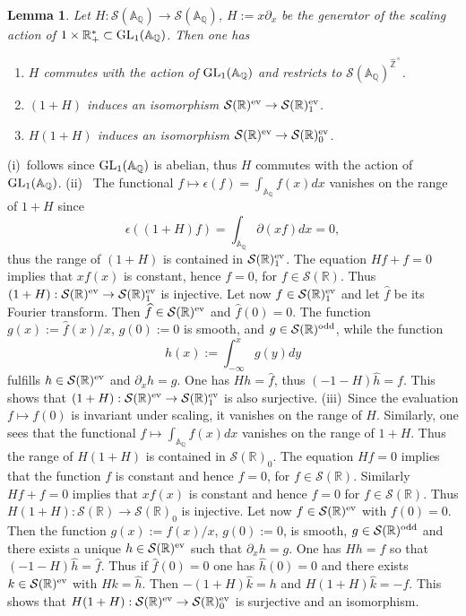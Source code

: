 \documentclass{pspum-l}
\newtheorem{lemma}[theorem]{Lemma}
\theoremstyle{definition}
\theoremstyle{remark}
\numberwithin{equation}{section}
\def\A{{\mathbb A}}
\def\Q{{\mathbb Q}}
\def\R{{\mathbb R}}
\def\Z{{\mathbb Z}}
\def\cS{{\mathcal S}}
\def\hatz{{\hat\Z^\times}}
\def\GL{{\rm GL}}
\begin{document}
\begin{lemma} \label{quotbruhatschwartz} Let $H:\cS(\A_\Q)\to \cS(\A_\Q)$, $H:=x\partial_x$ be the generator of the scaling action of $1\times \R_+^*\subset \GL_1(\A_\Q)$. Then one has
\begin{enumerate}
\item[(i)] $H$  commutes with the action of $\GL_1(\A_\Q)$ and  restricts 
to $\cS(\A_\Q)^{\hatz}$.
\item[(ii)] $(1+H)$  induces an isomorphism $\cS(\R)^{\rm ev}\to \cS(\R)_1^{\rm ev}$.
\item[(iii)] $H(1+H)$  induces an isomorphism $\cS(\R)^{\rm ev}\to \cS(\R)_0^{\rm ev}$.
\end{enumerate}
\end{lemma}
\proof  (i)~follows since $\GL_1(\A_\Q)$ is abelian, thus $H$  commutes with the action of $\GL_1(\A_\Q)$.\newline
(ii)~ The functional $f\mapsto \epsilon(f)=\int_{\A_\Q}  f(x)dx$ vanishes on the range of $1+H$ since
\[
\epsilon((1+H)f)=\int_{\A_\Q} \partial(xf)dx=0,
\]
 thus the range of $(1+H)$ is contained in $\cS(\R)^{\rm ev}_1$. The equation  $Hf+f=0$ implies that $xf(x)$ is constant, hence  $f=0$, for $f\in \cS(\R)$. Thus $(1+H):\cS(\R)^{\rm ev}\to \cS(\R)_1^{\rm ev}$ is injective. Let now  $f\in\cS(\R)^{\rm ev}_1$ and let $\widehat f$ be its Fourier transform. Then $\widehat f \in \cS(\R)^{\rm ev}$ and $\widehat f(0)=0$. The function $g(x):=\widehat f(x)/x$, $g(0):=0$ is smooth, and $g\in\cS(\R)^{\rm odd}$, while the function 
 \[
 h(x):=\int_{-\infty}^x g(y)dy
 \]
fulfills $h\in\cS(\R)^{\rm ev}$ and $\partial_x h=g$. One has $Hh=\widehat f$, thus $(-1-H)\widehat h= f$. This shows that $(1+H):\cS(\R)^{\rm ev}\to \cS(\R)_1^{\rm ev}$ is also surjective. \newline
(iii)~Since the evaluation $f\mapsto f(0)$ is invariant under scaling, it vanishes on the range of $H$. Similarly, one sees that the functional $f\mapsto \int_{\A_\Q}  f(x)dx$ vanishes on the range of $1+H$. Thus the range of $H(1+H)$ is contained in $\cS(\R)_0$. The equation $Hf=0$ implies that the function $f$ is constant and hence $f=0$, for $f\in \cS(\R)$. Similarly $Hf+f=0$ implies that $xf(x)$ is constant and hence $f=0$ for $f\in \cS(\R)$. Thus $H(1+H): \cS(\R)\to \cS(\R)_0$ is injective. Let now $f\in\cS(\R)^{\rm ev}$  with $f(0)=0$. Then the function $g(x):=f(x)/x$, $g(0):=0$, is smooth, $g\in\cS(\R)^{\rm odd}$ and there exists a unique $h\in\cS(\R)^{\rm ev}$ such that $\partial_x h=g$. One has $Hh=f$ so that  $(-1-H)\widehat h=\widehat f$. Thus if $\widehat f(0)=0$ one has $\widehat h(0)=0$ and there exists $k\in\cS(\R)^{\rm ev}$ with $Hk=\widehat h$. Then $-(1+H)\widehat k=h$ and $H(1+H)\widehat k=-f$. This shows that $H(1+H):\cS(\R)^{\rm ev}\to \cS(\R)_0^{\rm ev}$ is surjective and an isomorphism.\endproof 
\end{document}
